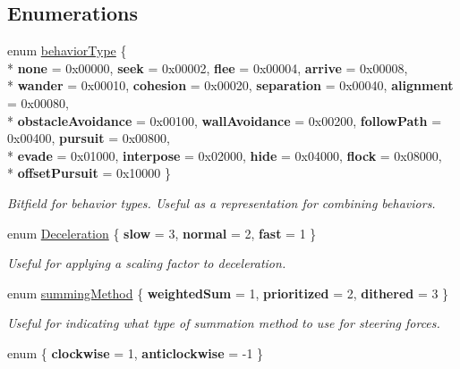 \subsection*{Enumerations}
\begin{DoxyCompactItemize}
\item 
enum \hyperlink{namespacesteer_afe6e72f8f8088962727051501181acbe}{behavior\-Type} \{ \\*
{\bfseries none} = 0x00000, 
{\bfseries seek} = 0x00002, 
{\bfseries flee} = 0x00004, 
{\bfseries arrive} = 0x00008, 
\\*
{\bfseries wander} = 0x00010, 
{\bfseries cohesion} = 0x00020, 
{\bfseries separation} = 0x00040, 
{\bfseries alignment} = 0x00080, 
\\*
{\bfseries obstacle\-Avoidance} = 0x00100, 
{\bfseries wall\-Avoidance} = 0x00200, 
{\bfseries follow\-Path} = 0x00400, 
{\bfseries pursuit} = 0x00800, 
\\*
{\bfseries evade} = 0x01000, 
{\bfseries interpose} = 0x02000, 
{\bfseries hide} = 0x04000, 
{\bfseries flock} = 0x08000, 
\\*
{\bfseries offset\-Pursuit} = 0x10000
 \}
\begin{DoxyCompactList}\small\item\em Bitfield for behavior types. Useful as a representation for combining behaviors. \end{DoxyCompactList}\item 
enum \hyperlink{namespacesteer_a05e7b3b5c0df931b74d0483b14ff2178}{Deceleration} \{ {\bfseries slow} = 3, 
{\bfseries normal} = 2, 
{\bfseries fast} = 1
 \}
\begin{DoxyCompactList}\small\item\em Useful for applying a scaling factor to deceleration. \end{DoxyCompactList}\item 
enum \hyperlink{namespacesteer_ae984f1d102037f282e7029dd1f41a50f}{summing\-Method} \{ {\bfseries weighted\-Sum} = 1, 
{\bfseries prioritized} = 2, 
{\bfseries dithered} = 3
 \}
\begin{DoxyCompactList}\small\item\em Useful for indicating what type of summation method to use for steering forces. \end{DoxyCompactList}\item 
enum \{ {\bfseries clockwise} = 1, 
{\bfseries anticlockwise} = -\/1
 \}
\end{DoxyCompactItemize}
